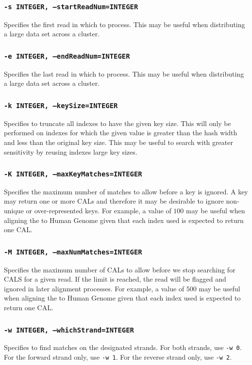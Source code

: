 \documentclass[a4paper,12pt]{book}
\newcommand{\TT}[1]{{\tt #1}} %
\begin{document}
\subsubsection{\TT{-s INTEGER, --startReadNum=INTEGER}}
Specifies the first read in which to process.
This may be useful when distributing a large data set across a cluster.

\subsubsection{\TT{-e INTEGER, --endReadNum=INTEGER}}
Specifies the last read in which to process.
This may be useful when distributing a large data set across a cluster.

\subsubsection{\TT{-k INTEGER, --keySize=INTEGER}}
Specifies to truncate all indexes to have the given key size.
This will only be performed on indexes for which the given value is greater than the hash width and less than the original key size.
This may be useful to search with greater sensitivity by reusing indexes large key sizes.

\subsubsection{\TT{-K INTEGER, --maxKeyMatches=INTEGER}}
Specifies the maximum number of matches to allow before a key is ignored.  
A key may return one or more CALs and therefore it may be desirable to ignore non-unique or over-represented keys.
For example, a value of $100$ may be useful when aligning the to Human Genome given that each index used is expected to return one CAL.

\subsubsection{\TT{-M INTEGER, --maxNumMatches=INTEGER}}
Specifies the maximum number of CALs to allow before we stop searching for CALS for a given read.
If the limit is reached, the read will be flagged and ignored in later alignment processes.
For example, a value of $500$ may be useful when aligning the to Human Genome given that each index used is expected to return one CAL.
\subsubsection{\TT{-w INTEGER, --whichStrand=INTEGER}}
Specifies to find matches on the designated strands.
For both strands, use \TT{-w 0}.
For the forward strand only, use \TT{-w 1}.
For the reverse strand only, use \TT{-w 2}.
\end{document}
